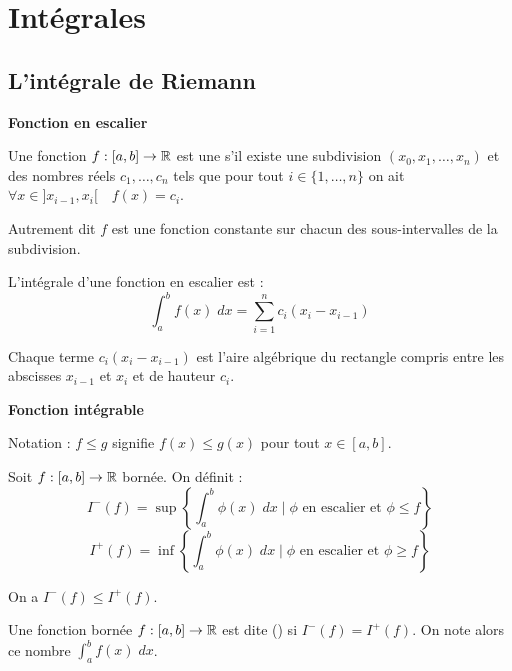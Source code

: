 \documentclass[10pt,class=article,crop=false]{standalone}
\begin{document}
	
\section{Intégrales}

\begin{multicols}{2}
	


\subsection{L'intégrale de Riemann}

\textbf{Fonction en escalier}



Une fonction $f : [a,b] \to \mathbb{R}$ est une 
s'il existe  une subdivision $(x_0,x_1,\ldots,x_n)$ et des nombres réels
$c_1,\ldots,c_n$ tels que pour tout $i\in \{1,\ldots,n\}$ on ait
$\forall x \in {}]x_{i-1},x_i[ \quad f(x)=c_i$.

Autrement dit $f$ est une fonction constante sur chacun des sous-intervalles de la subdivision.

L'intégrale d'une fonction en escalier est :
$$\displaystyle \int_a^b f(x) \; dx = \sum_{i=1}^n c_i(x_i-x_{i-1})$$


Chaque terme $c_i(x_i-x_{i-1})$ est l'aire algébrique du rectangle compris entre les abscisses
$x_{i-1}$ et $x_i$ et de hauteur $c_i$.


\textbf{Fonction intégrable}

Notation : $f \le g$ signifie  $f(x) \le g(x)$ pour tout $x \in [a,b]$.

\bigskip

Soit $f : [a,b] \to \mathbb{R}$ bornée. On définit :
$$I^-(f) = \sup \left\{ \int_a^b \phi(x) \; dx \mid \phi \text{ en escalier et } \phi \le f \right\}$$
$$I^+(f) = \inf \left\{ \int_a^b \phi(x) \; dx \mid \phi \text{ en escalier et } \phi \ge f \right\}$$



On a $I^-(f) \le I^+(f)$.

Une fonction bornée $f :[a,b] \to \mathbb{R}$ est dite  ()
si $I^-(f) = I^+(f)$. On note alors ce nombre $\int_a^b f(x)\; dx$.




\end{multicols}
\end{document}
